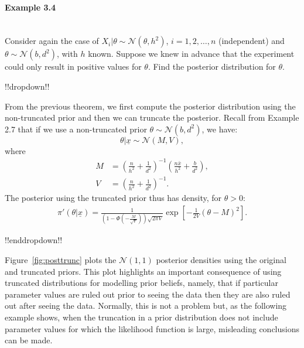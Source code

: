 \paragraph{Example 3.4}{~\\
Consider again the case of $X_i|\theta\sim \mathcal{N}(\theta,h^2)$, $i=1,2,\ldots,n$
(independent) and $\theta\sim \mathcal{N}(b,d^2)$, with $h$ known.
Suppose we knew in advance that the experiment could only result in positive values for $\theta$.
Find the posterior distribution for $\theta$.

!!dropdown!!

From the previous theorem, we first compute the posterior distribution using the non-truncated prior and then we can truncate the posterior. Recall from Example 2.7 that if we use a non-truncated prior $\theta \sim\mathcal{N}(b,d^2)$, we have:
    $$ \theta | \underline{x} \sim \mathcal{N}(M, V), $$
    where
    \begin{align*}
        M &= \left(\frac{n}{h^2} + \frac{1}{d^2}\right)^{-1}\left(\frac{n\bar{x}}{h^2} + \frac{b}{d^2}\right), \\
        V &= \left(\frac{n}{h^2} + \frac{1}{d^2}\right)^{-1}.
    \end{align*}
    The posterior using the truncated prior thus has density, for $\theta > 0$:
    \begin{align*}
        \pi'(\theta | \underline{x}) = \frac{1}{\left(1 - \Phi\left(-\frac{M}{\sqrt{V}}\right)\right) \sqrt{2\pi V}}\exp\left[-\frac{1}{2V}(\theta - M)^2\right].
    \end{align*}

!!enddropdown!!

Figure~\ref{fig:posttrunc} plots the $\mathcal{N}(1,1)$ posterior densities
using the original and truncated priors.
This plot highlights an important consequence of using truncated
distributions for modelling prior beliefs, namely, that if particular
parameter values are ruled out prior to seeing the data then they are
also ruled out after seeing the data. Normally, this is not a problem
but, as the following example shows, when the truncation in a prior
distribution does not include parameter values for which the
likelihood function is large, misleading conclusions can be made.

\begin{figure}[h!]


\end{figure}}
